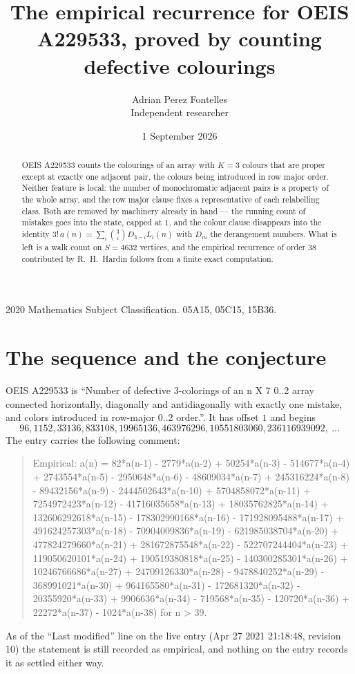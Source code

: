 \documentclass[11pt,a4paper]{article}
\title{The empirical recurrence for OEIS A229533, proved by counting defective colourings}
\author{Adrian Perez Fontelles\\ \small Independent researcher}
\date{1 September 2026}
\theoremstyle{plain}
\theoremstyle{definition}
\begin{document}
\maketitle

\begin{abstract}
OEIS A229533 counts the colourings of an array with $K=3$ colours that are proper except at
exactly one adjacent pair, the colours being introduced in row
major order. Neither feature is local: the number of monochromatic adjacent pairs is a
property of the whole array, and the row major clause fixes a representative of each
relabelling class. Both are removed by machinery already in hand --- the running count of
mistakes goes into the state, capped at $1$, and the colour clause disappears into the
identity $3!\,a(n)=\sum_i\binom{3}{i}D_{3-i}L_i(n)$ with $D_m$ the derangement
numbers. What is left is a walk count on $S=4632$ vertices, and the empirical recurrence of
order $38$ contributed by R.~H.~Hardin follows from a finite exact computation.
\end{abstract}

\noindent\small 2020 Mathematics Subject Classification. 05A15, 05C15, 15B36.\normalsize

\section{The sequence and the conjecture}

OEIS A229533 is ``Number of defective 3-colorings of an n X 7 0..2 array connected horizontally, diagonally and antidiagonally with exactly one mistake, and colors introduced in row-major 0..2 order.''. It has offset $1$ and begins
\[
96, 1152, 33136, 833108, 19965136, 463976296, 10551803060, 236116939092,\ \dots
\]
The entry carries the following comment:
\begin{quote}\small
Empirical: a(n) = 82*a(n-1) - 2779*a(n-2) + 50254*a(n-3) - 514677*a(n-4) + 2743554*a(n-5) - 2950648*a(n-6) - 48609034*a(n-7) + 245316224*a(n-8) - 89432156*a(n-9) - 2444502643*a(n-10) + 5704858072*a(n-11) + 7254972423*a(n-12) - 41716035658*a(n-13) + 18035762825*a(n-14) + 132606292618*a(n-15) - 178302990168*a(n-16) - 171928095488*a(n-17) + 491624257303*a(n-18) - 70904009836*a(n-19) - 621985038704*a(n-20) + 477824279660*a(n-21) + 281672875548*a(n-22) - 522707244404*a(n-23) + 119050620101*a(n-24) + 190519380818*a(n-25) - 140300285301*a(n-26) + 10246766686*a(n-27) + 24709126330*a(n-28) - 9478840252*a(n-29) - 368991021*a(n-30) + 964165580*a(n-31) - 172681320*a(n-32) - 20355920*a(n-33) + 9906636*a(n-34) - 719568*a(n-35) - 120720*a(n-36) + 22272*a(n-37) - 1024*a(n-38) for n > 39.
\end{quote}
As of the ``Last modified'' line on the live entry (Apr 27 2021 21:18:48, revision 10) the statement is
still recorded as empirical, and nothing on the entry records it as settled either way.
\end{document}
